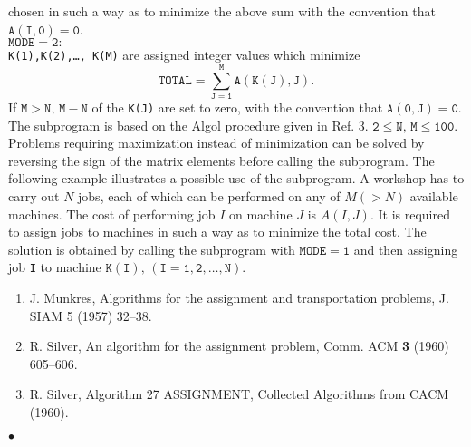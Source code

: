 chosen in such a way as to minimize the above sum with the convention
that $\mathtt{A(I,0)=0}$.
\\[3mm]
$\mathtt{MODE=2}:$ \\[2mm]
{\tt K(1),K(2),\ldots, K(M)} are assigned integer values which minimize
$$ \mathtt{TOTAL = \sum_{J=1}^M A(K(J),J)}.$$
If $\mathtt{M>N}$, $\mathtt{M-N}$ of the {\tt K(J)} are set to zero,
with the convention that $\mathtt{A(0,J)=0}$.
\newpage
\Method
The subprogram is based on the Algol procedure given in Ref. 3.
\Restrict
$\mathtt{2 \leq N,\,M \leq 100}$.
\Notes
Problems requiring maximization instead of minimization can be solved by
reversing the sign of the matrix elements before calling the subprogram.
\Examples
The following example illustrates a possible use of the subprogram.
A workshop has to carry out $N$ jobs, each of
which can be performed on any of $M (>N)$ available machines.
The cost of performing job $I$ on machine $J$ is $A(I,J)$.
It is required to assign jobs to machines in such a way
as to minimize the total cost.
The solution is obtained by calling the subprogram
with $\mathtt{MODE=1}$ and then assigning job {\tt I} to machine
$\mathtt{K(I),\,(I=1,2,\ldots,N)}$.
\Refer
\begin{enumerate}
\item J. Munkres, Algorithms for the assignment and
transportation problems, J. SIAM 5 (1957) 32--38.
\item R. Silver, An algorithm for the assignment problem,
Comm. ACM {\bf 3} (1960) 605--606.
\item R. Silver, Algorithm 27 ASSIGNMENT, Collected Algorithms from CACM
(1960).
\end{enumerate}
$\bullet$

